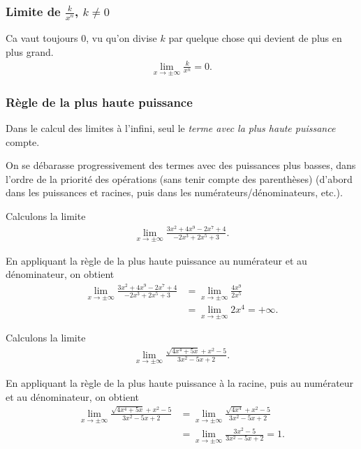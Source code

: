 \documentclass[main.tex]{subfiles}
\begin{document}
\subsubsection{Limite de $\frac k {x^n}$, $k \neq 0$}

Ca vaut toujours $0$,
vu qu'on divise $k$ par quelque chose qui devient de plus en plus grand.
\begin{align}
    \lim_{x \to \pm \infty} \frac k {x^n} = 0.
\end{align}

\subsubsection{Règle de la plus haute puissance}

\begin{remark}

    Dans le calcul des limites à l'infini,
    seul le \emph{terme avec la plus haute puissance} compte.

    On se débarasse progressivement des termes avec des puissances plus basses,
    dans l'ordre de la priorité des opérations (sans tenir compte des parenthèses)
    (d'abord dans les puissances et racines, puis dans les numérateurs/dénominateurs, etc.).
\end{remark}

\begin{example}

    Calculons la limite
    \begin{align*}
        \lim_{x \to \pm \infty} \frac {3x^2 + 4 x^9 - 2 x^7 + 4} {-2x^3 + 2x^5 + 3}.
    \end{align*}

    En appliquant la règle de la plus haute puissance au numérateur et au dénominateur,
    on obtient
    \begin{align*}
        \lim_{x \to \pm \infty} \frac {3x^2 + 4 x^9 - 2 x^7 + 4} {-2x^3 + 2x^5 + 3}
        &= \lim_{x \to \pm \infty} \frac {4 x^9} {2 x^5}\\
        &= \lim_{x \to \pm \infty} 2 x^4 = +\infty.
    \end{align*}
\end{example}

\begin{example}

    Calculons la limite
    \begin{align}
        \lim_{x \to \pm \infty} \frac {\sqrt{4x^4 + 5x} + x^2 - 5} {3 x^2 - 5x + 2}.
    \end{align}

    En appliquant la règle de la plus haute puissance à la racine,
    puis au numérateur et au dénominateur,
    on obtient
    \begin{align}
        \lim_{x \to \pm \infty} \frac {\sqrt{4x^4 + 5x} + x^2 - 5} {3 x^2 - 5x + 2}
        &= \lim_{x \to \pm \infty} \frac {\sqrt{4x^4} + x^2 - 5} {3 x^2 - 5x + 2}\\
        &= \lim_{x \to \pm \infty} \frac {3 x^2 - 5} {3 x^2 - 5x + 2} = 1.
    \end{align}
\end{example}
\end{document}
